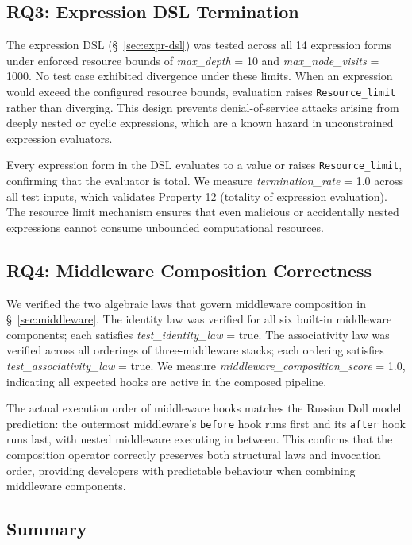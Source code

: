 \subsection{RQ3: Expression DSL Termination}
\label{sec:eval:expr-dsl}

The expression DSL (\S~\ref{sec:expr-dsl}) was tested across all 14 expression forms under enforced resource bounds of \emph{max\_depth} = 10 and \emph{max\_node\_visits} = 1000. No test case exhibited divergence under these limits. When an expression would exceed the configured resource bounds, evaluation raises \texttt{Resource\_limit} rather than diverging. This design prevents denial-of-service attacks arising from deeply nested or cyclic expressions, which are a known hazard in unconstrained expression evaluators.

Every expression form in the DSL evaluates to a value or raises \texttt{Resource\_limit}, confirming that the evaluator is total. We measure \emph{termination\_rate} = 1.0 across all test inputs, which validates Property 12 (totality of expression evaluation). The resource limit mechanism ensures that even malicious or accidentally nested expressions cannot consume unbounded computational resources.

\subsection{RQ4: Middleware Composition Correctness}
\label{sec:eval:middleware}

We verified the two algebraic laws that govern middleware composition in \S~\ref{sec:middleware}. The identity law was verified for all six built-in middleware components; each satisfies \emph{test\_identity\_law} = true. The associativity law was verified across all orderings of three-middleware stacks; each ordering satisfies \emph{test\_associativity\_law} = true. We measure \emph{middleware\_composition\_score} = 1.0, indicating all expected hooks are active in the composed pipeline.

The actual execution order of middleware hooks matches the Russian Doll model prediction: the outermost middleware's \texttt{before} hook runs first and its \texttt{after} hook runs last, with nested middleware executing in between. This confirms that the composition operator correctly preserves both structural laws and invocation order, providing developers with predictable behaviour when combining middleware components.

\subsection{Summary}
\label{sec:eval:summary}


